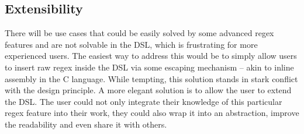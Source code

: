 \subsection{Extensibility} \label{sec:extensibility}

There will be use cases that could be easily solved by some advanced regex features and are not solvable in the DSL, which is frustrating for more experienced users. The easiest way to address this would be to simply allow users to insert raw regex inside the DSL via some escaping mechanism -- akin to inline assembly in the C language. While tempting, this solution stands in stark conflict with the design principle. A more elegant solution is to allow the user to extend the DSL. The user could not only integrate their knowledge of this particular regex feature into their work, they could also wrap it into an abstraction, improve the readability and even share it with others.

